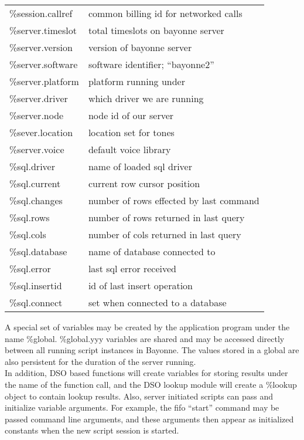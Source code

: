 \documentclass[a4paper,12pt]{article}
\begin{document}
\begin{supertabular}{ll}
\%session.callref	& common billing id for networked calls \\
\%server.timeslot       & total timeslots on bayonne server \\
\%server.version        & version of bayonne server \\
\%server.software       & software identifier; ``bayonne2'' \\
\%server.platform	& platform running under \\
\%server.driver         & which driver we are running \\
\%server.node           & node id of our server \\
\%sever.location	& location set for tones \\
\%server.voice		& default voice library \\
\%sql.driver            & name of loaded sql driver \\
\%sql.current		& current row cursor position \\
\%sql.changes		& number of rows effected by last command \\
\%sql.rows              & number of rows returned in last query \\
\%sql.cols              & number of cols returned in last query \\
\%sql.database          & name of database connected to \\
\%sql.error             & last sql error received \\
\%sql.insertid          & id of last insert operation \\
\%sql.connect		& set when connected to a database \\
\end{supertabular}

A special set of variables may be created by the application program
under the name \%global.  \%global.yyy variables are shared and may
be accessed directly between all running script instances in Bayonne. 
The values stored in a global are also persistent for the duration of
the server running. \\

In addition, DSO based functions will create variables for storing
results under the name of the function call, and the DSO lookup
module will create a \%lookup object to contain lookup results.  Also,
server initiated scripts can pass and initialize variable arguments.  For 
example, the fifo ``start'' command may be passed command line arguments,
and these arguments then appear as initialized constants when the new
script session is started. \\
\end{document}
